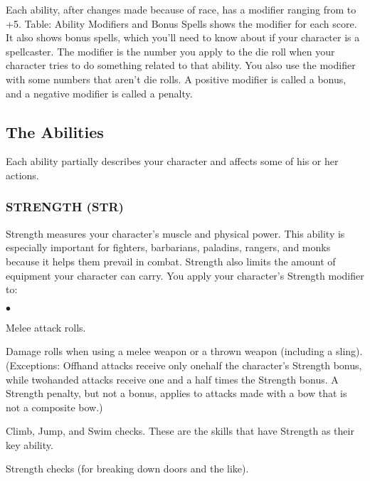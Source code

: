 Each ability, after changes made because of race, has a modifier ranging from  to +5. Table: Ability Modifiers and Bonus Spells shows the modifier for each score. It also shows bonus spells, which you'll need to know about if your character is a spellcaster.
The modifier is the number you apply to the die roll when your character tries to do something related to
that ability. You also use the modifier with some numbers that aren't die rolls. A positive modifier is called a bonus, and a negative modifier is called a penalty.


\subsection{The Abilities}
\vspace*{10pt}
Each ability partially describes your character and affects some of his or her actions.

\subsubsection{STRENGTH (STR)}

Strength measures your character's muscle and physical power. This ability is especially important for fighters, barbarians, paladins, rangers, and monks because it helps them prevail in combat. Strength also limits the amount of equipment your character can carry.
You apply your character's Strength modifier to:
\begin{list}{$\bullet$}{\itemspace}
	\item Melee attack rolls.
	\item Damage rolls when using a melee weapon or a thrown weapon (including a sling). (Exceptions: Off\textendash hand attacks receive only one\textendash half the character's Strength bonus, while two\textendash handed attacks receive one and a half times the Strength bonus. A Strength penalty, but not a bonus, applies to attacks made with a bow that is not a composite bow.)
	\item Climb, Jump, and Swim checks. These are the skills that have Strength as their key ability.
	\item Strength checks (for breaking down doors and the like).
\end{list}

